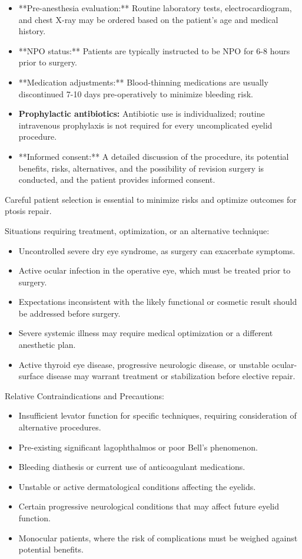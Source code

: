\begin{itemize}
  \item **Pre-anesthesia evaluation:** Routine laboratory tests, electrocardiogram, and chest X-ray may be ordered based on the patient's age and medical history.
  \item **NPO status:** Patients are typically instructed to be NPO for 6-8 hours prior to surgery.
  \item **Medication adjustments:** Blood-thinning medications are usually discontinued 7-10 days pre-operatively to minimize bleeding risk.
  \item \textbf{Prophylactic antibiotics:} Antibiotic use is individualized; routine intravenous prophylaxis is not required for every uncomplicated eyelid procedure.
  \item **Informed consent:** A detailed discussion of the procedure, its potential benefits, risks, alternatives, and the possibility of revision surgery is conducted, and the patient provides informed consent.
\end{itemize}

Careful patient selection is essential to minimize risks and optimize outcomes for ptosis repair.

Situations requiring treatment, optimization, or an alternative technique:
\begin{itemize}
  \item Uncontrolled severe dry eye syndrome, as surgery can exacerbate symptoms.
  \item Active ocular infection in the operative eye, which must be treated prior to surgery.
  \item Expectations inconsistent with the likely functional or cosmetic result should be addressed before surgery.
  \item Severe systemic illness may require medical optimization or a different anesthetic plan.
  \item Active thyroid eye disease, progressive neurologic disease, or unstable ocular-surface disease may warrant treatment or stabilization before elective repair.
\end{itemize}

Relative Contraindications and Precautions:
\begin{itemize}
  \item Insufficient levator function for specific techniques, requiring consideration of alternative procedures.
  \item Pre-existing significant lagophthalmos or poor Bell's phenomenon.
  \item Bleeding diathesis or current use of anticoagulant medications.
  \item Unstable or active dermatological conditions affecting the eyelids.
  \item Certain progressive neurological conditions that may affect future eyelid function.
  \item Monocular patients, where the risk of complications must be weighed against potential benefits.
\end{itemize}

